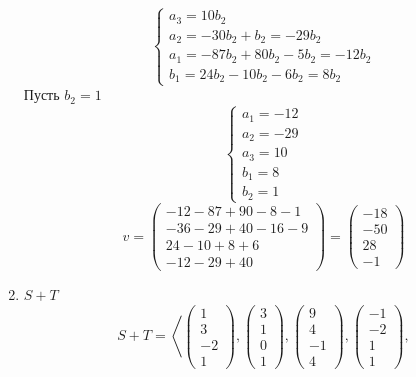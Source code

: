 \begin{enumerate}
$$\begin{cases}
    	a_3 = 10b_2 \\
        a_2 = -30b_2 + b_2 = -29b_2 \\
        a_1 = -87b_2 + 80b_2 - 5b_2 = -12b_2 \\
        b_1 = 24b_2 - 10b_2 - 6b_2 = 8b_2
    \end{cases} $$
    Пусть $ b_2 = 1 $
    $$
    \begin{cases}
    	a_1 = -12 \\
        a_2 = -29 \\
        a_3 = 10 \\
        b_1 = 8 \\
        b_2 = 1
    \end{cases} $$
    $$ v =
    \begin{pmatrix}
        -12 - 87 + 90 - 8 - 1 \\
        -36 - 29 + 40 - 16 - 9 \\
        24 - 10 + 8 + 6 \\
        -12 - 29 + 40
    \end{pmatrix} =
    \begin{pmatrix}
    	-18 \\
        -50 \\
        28 \\
        -1
    \end{pmatrix} $$
    \item $ S + T $
    $$ S + T = \left\langle
    \begin{pmatrix}
        1 \\
        3 \\
        -2 \\
        1
    \end{pmatrix},
    \begin{pmatrix}
        3 \\
        1 \\
        0 \\
        1
    \end{pmatrix},
    \begin{pmatrix}
        9 \\
        4 \\
        -1 \\
        4
    \end{pmatrix},
    \begin{pmatrix}
        -1 \\
        -2 \\
        1 \\
        1
    \end{pmatrix},
$$
\end{enumerate}
